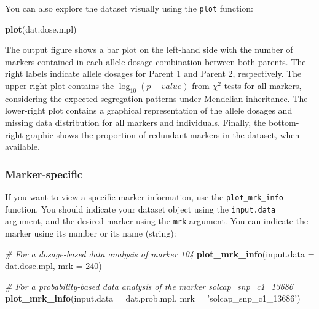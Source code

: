 \documentclass[
]{article}
\newenvironment{Shaded}{}{}
\newcommand{\CommentTok}[1]{\textcolor[rgb]{0.38,0.63,0.69}{\textit{#1}}}
\newcommand{\DataTypeTok}[1]{\textcolor[rgb]{0.56,0.13,0.00}{#1}}
\newcommand{\DecValTok}[1]{\textcolor[rgb]{0.25,0.63,0.44}{#1}}
\newcommand{\KeywordTok}[1]{\textcolor[rgb]{0.00,0.44,0.13}{\textbf{#1}}}
\newcommand{\NormalTok}[1]{#1}
\newcommand{\StringTok}[1]{\textcolor[rgb]{0.25,0.44,0.63}{#1}}
\begin{document}
You can also explore the dataset visually using the \texttt{plot}
function:

\begin{Shaded}
\begin{Highlighting}[]
\KeywordTok{plot}\NormalTok{(dat.dose.mpl)}
\end{Highlighting}
\end{Shaded}

The output figure shows a bar plot on the left-hand side with the number
of markers contained in each allele dosage combination between both
parents. The right labels indicate allele dosages for Parent 1 and
Parent 2, respectively. The upper-right plot contains the
\(\log_{10}(p-value)\) from \(\chi^2\) tests for all markers,
considering the expected segregation patterns under Mendelian
inheritance. The lower-right plot contains a graphical representation of
the allele dosages and missing data distribution for all markers and
individuals. Finally, the bottom-right graphic shows the proportion of
redundant markers in the dataset, when available.

\hypertarget{marker-specific}{%
\subsubsection{Marker-specific}\label{marker-specific}}

If you want to view a specific marker information, use the
\texttt{plot\_mrk\_info} function. You should indicate your dataset
object using the \texttt{input.data} argument, and the desired marker
using the \texttt{mrk} argument. You can indicate the marker using its
number or its name (string):

\begin{Shaded}
\begin{Highlighting}[]
\CommentTok{# For a dosage-based data analysis of marker 104}
\KeywordTok{plot_mrk_info}\NormalTok{(}\DataTypeTok{input.data =}\NormalTok{ dat.dose.mpl, }\DataTypeTok{mrk =} \DecValTok{240}\NormalTok{)}
\end{Highlighting}
\end{Shaded}

\begin{Shaded}
\begin{Highlighting}[]
\CommentTok{# For a probability-based data analysis of the marker solcap_snp_c1_13686}
\KeywordTok{plot_mrk_info}\NormalTok{(}\DataTypeTok{input.data =}\NormalTok{ dat.prob.mpl, }\DataTypeTok{mrk =} \StringTok{'solcap_snp_c1_13686'}\NormalTok{)}
\end{Highlighting}
\end{Shaded}
\end{document}
